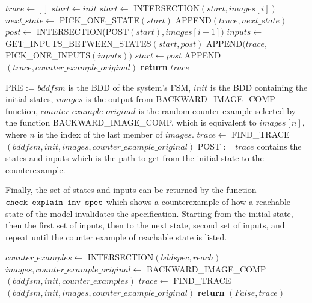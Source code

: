 \documentclass{article}
\begin{document}
\medskip

\begin{algorithmic}[1]
    \State $trace \leftarrow []$
    \State $start \leftarrow init$
     
        \State $start \leftarrow$ INTERSECTION$(start, images[i])$
        \State $next\_state \leftarrow$ PICK\_ONE\_STATE$(start)$
        \State APPEND$(trace, next\_state)$
        \State $post \leftarrow$ INTERSECTION(POST$(start), images[i+1])$
        \State $inputs \leftarrow$ GET\_INPUTS\_BETWEEN\_STATES$(start, post)$
        \State APPEND$(trace,$ PICK\_ONE\_INPUTS$(inputs))$
        \State $start \leftarrow post$
    \EndFor
    \State APPEND$(trace, counter\_example\_original)$
    \State \textbf{return }$trace$
\EndFunction
\item[]
\State PRE := $bddfsm$ is the BDD of the system's FSM, $init$ is the BDD containing the initial states, $images$ is the output from BACKWARD\_IMAGE\_COMP function, $counter\_example\_original$ is the random counter example selected by the function BACKWARD\_IMAGE\_COMP, which is equivalent to $images[n]$, where $n$ is the index of the last member of $images$.
\State $trace\leftarrow$ FIND\_TRACE$(bddfsm, init, images, counter\_example\_original)$
\State POST := $trace$ contains the states and inputs which is the path to get from the initial state to the counterexample.
\end{algorithmic}

\medskip

Finally, the set of states and inputs can be returned by the function $\verb|check_explain_inv_spec|$ which shows a counterexample of how a reachable state of the model invalidates the specification. Starting from the initial state, then the first set of inputs, then to the next state, second set of inputs, and repeat until the counter example of reachable state is listed.

\medskip

\begin{algorithmic}[1]
	\State $counter\_examples \leftarrow$ INTERSECTION$(bddspec, reach)$
    \State $images,counter\_example\_original \leftarrow$ \newline
            \hspace*{5em}BACKWARD\_IMAGE\_COMP$(bddfsm, init, counter\_examples)$
    \State $trace \leftarrow$ \newline
            \hspace*{5em}FIND\_TRACE$(bddfsm, init, images, counter\_example\_original)$
    \State \textbf{return }$(False, trace)$
\EndIf
\end{algorithmic}
\end{document}
